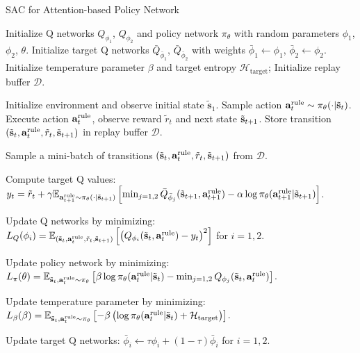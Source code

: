 \begin{algorithm}
\caption{SAC for Attention-based Policy Network}
\label{algo:SAC}
\begin{algorithmic}[1]
\STATE Initialize Q networks $Q_{\phi_1}$, $Q_{\phi_2}$ and policy network $\pi_\theta$ with random parameters $\phi_1$, $\phi_2$, $\theta$.
\STATE Initialize target Q networks $\bar{Q}_{\bar{\phi}_1}$, $\bar{Q}_{\bar{\phi}_2}$ with weights $\bar{\phi}_1 \leftarrow \phi_1$, $\bar{\phi}_2 \leftarrow \phi_2$.
\STATE Initialize temperature parameter $\beta$ and target entropy $\mathcal{H}_{\text{target}}$;
 Initialize replay buffer $\mathcal{D}$.

    \STATE Initialize environment and observe initial state $\tilde{\mathbf{s}}_1$.
        \STATE Sample action ${\mathbf{a}}^{\text{rule}}_t \sim \pi_\theta(\cdot|\tilde{{\mathbf{s}}}_t)$.
        \STATE Execute action ${\mathbf{a}}^{\text{rule}}_t$, observe reward $\tilde{r}_t$ and next state $\tilde{{\mathbf{s}}}_{t+1}$.
        \STATE Store transition $(\tilde{{\mathbf{s}}}_t, {\mathbf{a}}^{\text{rule}}_t, \tilde{r}_t, \tilde{{\mathbf{s}}}_{t+1})$ in replay buffer $\mathcal{D}$.
        
            \STATE Sample a mini-batch of transitions $(\tilde{{\mathbf{s}}}_t, {\mathbf{a}}^{\text{rule}}_t, \tilde{r}_t, \tilde{{\mathbf{s}}}_{t+1})$ from $\mathcal{D}$.
            
            \STATE Compute target Q values: $y_t = \tilde{r}_t + \gamma\mathbb{E}_{{\mathbf{a}}^{\text{rule}}_{t+1}\sim\pi_{\theta}(\cdot|\tilde{{\mathbf{s}}}_{t+1})}\left[  \min_{j=1,2} \bar{Q}_{\bar{\phi}_j}(\tilde{{\mathbf{s}}}_{t+1}, {\mathbf{a}}^{\text{rule}}_{t+1}) - \alpha \log \pi_\theta({\mathbf{a}}^{\text{rule}}_{t+1}|\tilde{{\mathbf{s}}}_{t+1}) \right]$.
            
            \STATE Update Q networks by minimizing:
            \STATE $L_Q(\phi_i) = \mathbb{E}_{(\tilde{{\mathbf{s}}}_t, {\mathbf{a}}^{\text{rule}}_t, \tilde{r}_t, \tilde{{\mathbf{s}}}_{t+1})} \left[ \left( Q_{\phi_i}(\tilde{{\mathbf{s}}}_t, {\mathbf{a}}^{\text{rule}}_t) - y_t \right)^2 \right]$ for $i = 1, 2$.
            
            \STATE Update policy network by minimizing:
            \STATE $L_\pi(\theta) = \mathbb{E}_{\tilde{{\mathbf{s}}}_t, {\mathbf{a}}^{\text{rule}}_t \sim \pi_\theta} \left[ \beta \log \pi_\theta({\mathbf{a}}^{\text{rule}}_t|\tilde{{\mathbf{s}}}_t) - \min_{j=1,2} Q_{\phi_j}(\tilde{{\mathbf{s}}}_t, {\mathbf{a}}^{\text{rule}}_t) \right]$.
            
            \STATE Update temperature parameter by minimizing:
            \STATE $L_\beta(\beta) = \mathbb{E}_{\tilde{{\mathbf{s}}}_t, {\mathbf{a}}^{\text{rule}}_t \sim \pi_\theta} \left[ -\beta \left( \log \pi_\theta({\mathbf{a}}^{\text{rule}}_t|\tilde{{\mathbf{s}}}_t) + \mathcal{H}_{\text{target}} \right) \right]$.
            
            \STATE Update target Q networks:
            \STATE $\bar{\phi}_i \leftarrow \tau \phi_i + (1 - \tau) \bar{\phi}_i$ for $i = 1, 2$.
        \ENDIF
    \ENDFOR
\ENDFOR
\end{algorithmic}
\end{algorithm}

